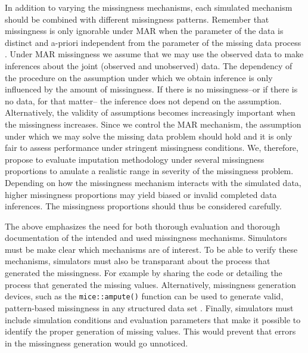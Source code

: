 \documentclass[bimj,fleqn]{w-art}
\begin{document}
In addition to varying the missingness mechanisms, each simulated mechanism should be combined with different missingness patterns. Remember that missingness is only ignorable under MAR when the parameter of the data is distinct and a-priori independent from the parameter of the missing data process \citep[Corollary 6.1A]{litt20}. Under MAR missingness we assume that we may use the observed data to make inferences about the joint (observed and unobserved) data. The dependency of the procedure on the assumption under which we obtain inference is only influenced by the amount of missingness. If there is no missingness--or if there is no data, for that matter-- the inference does not depend on the assumption. Alternatively, the validity of assumptions becomes increasingly important when the missingness increases. Since we control the MAR mechanism, the assumption under which we may solve the missing data problem should hold and it is only fair to assess performance under stringent missingness conditions. We, therefore, propose to evaluate imputation methodology under several missingness proportions to amulate a realistic range in severity of the missingness problem. Depending on how the missingness mechanism interacts with the simulated data, higher missingness proportions may yield biased or invalid completed data inferences. The missingness proportions should thus be considered carefully.

The above emphasizes the need for both thorough evaluation and thorough documentation of the intended and used missingness mechanisms. Simulators must be make clear which mechanisms are of interest. To be able to verify these mechanisms, simulators must also be transparant about the process that generated the missingness. For example by sharing the code or detailing the process that generated the missing values. Alternatively, missingness generation devices, such as the \texttt{mice::ampute()} function can be used to generate valid, pattern-based missingness in any structured data set \citep{mice, ampute}. Finally, simulators must include simulation conditions and evaluation parameters that make it possible to identify the proper generation of missing values. This would prevent that errors in the missingness generation would go unnoticed. 


\end{document}

